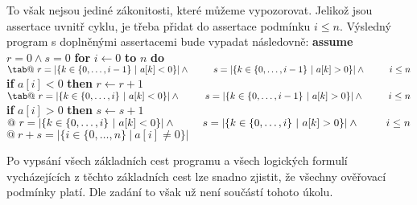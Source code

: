 \documentclass{article}
\newcommand\tab[1][0.5cm]{\hspace*{#1}}
\begin{document}
To však nejsou jediné zákonitosti, které můžeme vypozorovat. Jelikož jsou assertace uvnitř cyklu, je třeba přidat do assertace podmínku $i \leq n$. Výsledný program s doplněnými assertacemi bude vypadat následovně: \newline\newline \textbf{assume} $r = 0 \wedge s = 0$ \newline \textbf{for} $i \leftarrow 0$ \textbf{to} $n$ \textbf{do} \newline $\tab@\ r = |\{k \in \{0,\dots,i - 1\}\ |\ a[k] < 0\}| \wedge \newline \tab \phantom{@} \ s = |\{k \in \{0,\dots,i - 1\}\ |\ a[k] > 0\}| \wedge \newline \tab \phantom{@} \ i \leq n$ \newline \tab \textbf{if} $a[i] < 0$ \textbf{then} $r \leftarrow r + 1$ \newline $\tab@\ r = |\{k \in \{0,\dots,i\}\ |\ a[k] < 0\}| \wedge \newline \tab \phantom{@} \ s = |\{k \in \{0,\dots,i - 1\}\ |\ a[k] > 0\}| \wedge \newline \tab \phantom{@} \ i \leq n$ \newline \tab \textbf{if} $a[i] > 0$ \textbf{then} $s \leftarrow s + 1$ \newline \tab $@\ r = |\{k \in \{0,\dots,i\}\ |\ a[k] < 0\}| \wedge \newline \tab \phantom{@} \ s = |\{k \in \{0,\dots,i\}\ |\ a[k] > 0\}| \wedge \newline \tab \phantom{@} \ i \leq n$ \newline $@\ r + s = |\{i \in \{0,\dots,n\}\ |\ a[i] \neq 0\}|$ \newline

Po vypsání všech základních cest programu a všech logických formulí vycházejících z těchto základních cest lze snadno zjistit, že všechny ověřovací podmínky platí. Dle zadání to však už není součástí tohoto úkolu.
\end{document}
